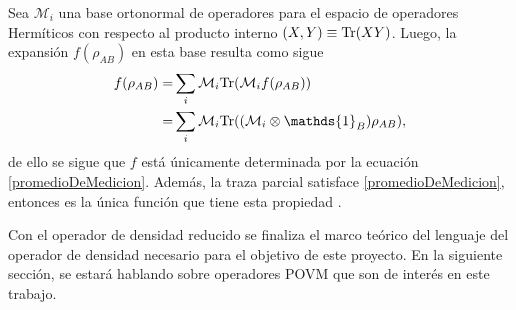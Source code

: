 Sea $\mathcal{M}_i$ una base ortonormal de operadores para el espacio de
operadores Hermíticos con respecto al producto interno $(X,Y) \equiv {\rm Tr}(XY)$. Luego, la expansión $f (\rho_{AB} )$ en esta base resulta como sigue
\[\begin{split}
	f(\rho_{AB})=&\sum_{i}\mathcal{M}_i\tr(\mathcal{M}_i f(\rho_{AB}))\\
	=&\sum_{i}\mathcal{M}_i \tr((\mathcal{M}_i\otimes \mathds{1}_B)\rho_{AB}),\\
\end{split}\] 
de ello se sigue que $f$ está únicamente determinada por la ecuación
{\ref{promedioDeMedicion}}. Además, la traza parcial satisface
{\ref{promedioDeMedicion}}, entonces es la única función que tiene esta
propiedad {\cite{nielsen_chuang_2010}}.

Con el operador de densidad reducido se finaliza el marco teórico del lenguaje
del operador de densidad necesario para el objetivo de este proyecto. En la
siguiente sección, se estará hablando sobre operadores POVM que son de interés
en este trabajo.











